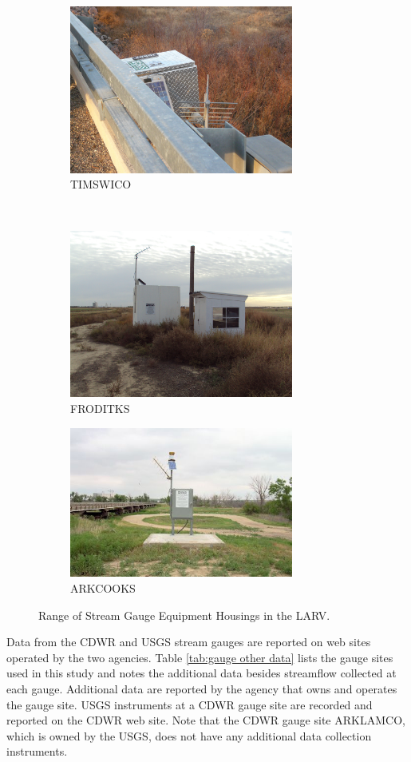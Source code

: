 \begin{figure}[htbp]
	\begin{subfigure}[t]{0.5\textwidth}
		\centering
		\includegraphics[width=2.9in]{Figures/Photo/GaugeSite3}
		\caption{TIMSWICO}
	\end{subfigure}%
	~
	\begin{subfigure}[t]{0.5\textwidth}
		\centering
		\includegraphics[width=2.9in]{Figures/Photo/GaugeSite4}
		\caption{FRODITKS}
	\end{subfigure}
	
	\begin{subfigure}[t]{0.5\textwidth}
		\centering
		\includegraphics[width=2.9in]{Figures/Photo/GaugeSite6}
		\caption{ARKCOOKS}
	\end{subfigure}%
	\caption[Range of Stream Gauge Equipment Housings in the LARV.]{Range of Stream Gauge Equipment Housings in the LARV.}
	\label{pic:Housings}
\end{figure}

Data from the CDWR and USGS stream gauges are reported on web sites operated by the two agencies.  Table \ref{tab:gauge other data} lists the gauge sites used in this study and notes the additional data besides streamflow collected at each gauge.  Additional data are reported by the agency that owns and operates the gauge site.  USGS instruments at a CDWR gauge site are recorded and reported on the CDWR web site.  Note that the CDWR gauge site ARKLAMCO, which is owned by the USGS, does not have any additional data collection instruments.

